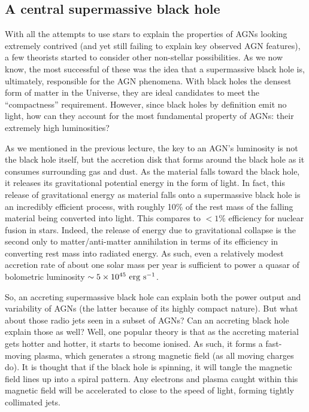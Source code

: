 \documentclass[11pt]{article}
\begin{document}
\subsection{A central supermassive black hole}
With all the attempts to use stars to explain the properties of AGNs
looking extremely contrived (and yet still failing to explain key
observed AGN features), a few theorists started to consider other
non-stellar possibilities. As we now know, the most successful of
these was the idea that a supermassive black hole is, ultimately,
responsible for the AGN phenomena. With black holes the densest form
of matter in the Universe, they are ideal candidates to meet the
``compactness'' requirement. However, since black holes by definition
emit no light, how can they account for the most fundamental property
of AGNs: their extremely high luminosities?

As we mentioned in the previous lecture, the key to an AGN's
luminosity is not the black hole itself, but the accretion disk that
forms around the black hole as it consumes surrounding gas and
dust. As the material falls toward the black hole, it releases its
gravitational potential energy in the form of light. In fact, this
release of gravitational energy as material falls onto a supermassive
black hole is an incredibly efficient process, with roughly 10\% of
the rest mass of the falling material being converted into light. This
compares to $<1\%$ efficiency for nuclear fusion in stars. Indeed, the
release of energy due to gravitational collapse is the second only to
matter/anti-matter annihilation in terms of its efficiency in
converting rest mass into radiated energy. As such, even a relatively
modest accretion rate of about one solar mass per year is sufficient
to power a quasar of bolometric luminosity
$\sim 5\times10^{45}~{\rm erg~s^{-1}}$.

So, an accreting supermassive black hole can explain both the power
output and variability of AGNs (the latter because of its highly
compact nature). But what about those radio jets seen in a subset of
AGNs?  Can an accreting black hole explain those as well? Well, one
popular theory is that as the accreting material gets hotter and
hotter, it starts to become ionised. As such, it forms a fast-moving
plasma, which generates a strong magnetic field (as all moving charges
do). It is thought that if the black hole is spinning, it will tangle
the magnetic field lines up into a spiral pattern. Any electrons and
plasma caught within this magnetic field will be accelerated to close
to the speed of light, forming tightly collimated jets.
\end{document}
